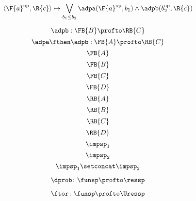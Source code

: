 {\begin{forslides}
\begin{equation}\label{eq:adp12pfexpr}
\langle\F{a}^{\text{op}}, \R{c}\rangle \mapsto \bigvee_{b_1\leq b_2} \adpa(\F{a}^{\text{op}}, b_1) \wedge \adpb(b_2^{\text{op}}, \R{c})
\end{equation}

\begin{equation}\label{eq:adp2}
\adpb: \FB{B} \profto  \RB{C}
\end{equation}
\begin{equation}\label{eq:adp1adp2}
\adpa\fthen\adpb: \FB{A} \profto  \RB{C}
\end{equation}
\begin{equation}\label{eq:FA}
\FB{A}
\end{equation}
\begin{equation}\label{eq:FB}
\FB{B}
\end{equation}
\begin{equation}\label{eq:FC}
\FB{C}
\end{equation}
\begin{equation}\label{eq:FD}
\FB{D}
\end{equation}
\begin{equation}\label{eq:RA}
\RB{A}
\end{equation}
\begin{equation}\label{eq:RB}
\RB{B}
\end{equation}
\begin{equation}\label{eq:RC}
\RB{C}
\end{equation}
\begin{equation}\label{eq:RD}
\RB{D}
\end{equation}
  \begin{equation}
  \label{eq:impsp1}
  \impsp_1
\end{equation}
\begin{equation}
  \label{eq:impsp2}
  \impsp_2
\end{equation}
\begin{equation}\label{eq:impsp12}
\impsp_{1} \setconcat \impsp_{2}
\end{equation}
\end{forslides}

\begin{forslides}
\begin{equation}\label{eq:dproba}
  \dprob \colon \funsp \profto \ressp
\end{equation}

\begin{equation}\label{eq:dprob2}
  \ftor \colon \funsp \profto \Uressp
\end{equation}
\end{forslides}
}

